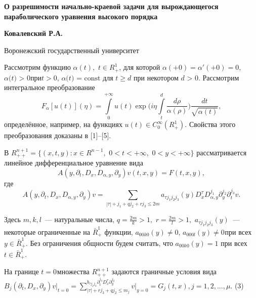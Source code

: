 \begin{center}
\textbf{О разрешимости начально-краевой задачи для вырождающегося
параболического уравнения высокого порядка}
\end{center}

\begin{center}
\textbf{Ковалевский Р.А.}
\end{center}

\begin{center}
Воронежский государственный университет
\end{center}





Рассмотрим функцию $\alpha (t),\,\,t \in R_ + ^1 $, для которой $\alpha ( +
0) = {\alpha }'( + 0) = 0$, $\alpha \mbox{(}t\mbox{) > 0}$при$t > 0$,
$\alpha \mbox{(}t\mbox{) = const}$ для $t \ge d$ при некотором $d\mbox{ >
0}$. Рассмотрим интегральное преобразование
\[
F_\alpha [u(t)](\eta ) = \int\limits_0^{ + \infty } {u(t)\exp (i\eta }
\int\limits_t^d {\frac{d\rho }{\alpha (\rho )}} )\frac{dt}{\sqrt {\alpha
(t)} },
\]
определённое, например, на функциях
$u(t) \in C_0^\infty (R_ + ^1 )$.
Свойства этого преобразования доказаны в [1]--[5].

В $R_{ + + }^{n + 1} = \{(x,t,y):x \in R^{n - 1},\,\,0 < t < + \infty ,\,\,0
< y < + \infty \}$ рассматривается линейное дифференциальное уравнение вида
\begin{equation}
\label{eq4700}
A(y,\partial _t ,D_x ,D_{\alpha ,y} ,\partial _y )v(t,x,y) = F(t,x,y),
\end{equation}
где
\begin{equation}
\label{eq4701}
A(y,\partial _t ,D_x ,D_{\alpha ,y} ,\partial _y )v = \sum\limits_{\left|
\tau \right| + j_1 + qj_2 + rj_3 \le 2m} {a_{\tau j_1 j_2 j_3 } (y)D_x^\tau
D_{\alpha ,y}^{j_1 } } \partial _y^{j_2 } \partial _t^{j_3 } v.
\end{equation}



Здесь $m,k,l$~--- натуральные числа, $q = \frac{2m}{k} > 1,\,\,r = \frac{2m}{l} >
1,\,\,a_{\tau j_1 j_2 j_3 } (y)$~--- некоторые ограниченные на $\bar {R}_ + ^1
$ функции,
\linebreak
$a_{00k0} (y) \ne 0$, $a_{000l} (y) \ne 0_{ }$при всех$y \in
\bar {R}_ + ^1 .$ Без ограничения общности будем считать, что $a_{00k0} (y)
= 1$ при всех $t \in \bar {R}_ + ^1 .$

На границе $t = 0_{ }$множества $R_{ + + }^{n + 1} $ задаются граничные
условия вида$B_j (\partial _t ,D_x ,\partial _y )\left. v \right|_{t = 0} =
\sum\limits_{\left| \tau \right| + rj_3 + qj_2 \le m_j }^ {b_{\tau j_2 j_3 }
\partial _t^{j_3 } D_x^\tau \partial _y^{j_2 } } \left. v \right|_{y = 0} =
G_j (t,x),j = 1,2,...,\mu .$ (3)

